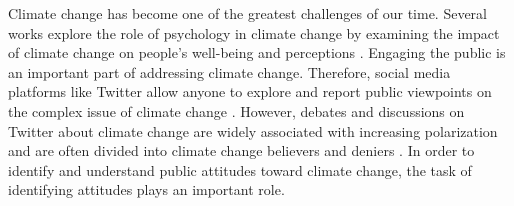 \documentclass[letterpaper]{article} %
\begin{document}
Climate change has become one of the greatest challenges of our time. %
Several works explore the role of psychology in climate change by examining the impact of climate change on people's well-being and perceptions \cite{clayton2020climate}. Engaging the public is an important part of addressing climate change. Therefore, social media platforms like Twitter allow anyone to explore and report public viewpoints on the complex issue of climate change \cite{lineman2015talking,dahal2019topic}. %
However, debates and discussions on Twitter about climate change are widely associated with increasing polarization and are often divided into climate change believers and deniers \cite{jang2015polarized}. In order to identify and understand public attitudes toward climate change, the task of identifying attitudes plays an important role.
\end{document}
